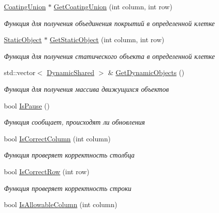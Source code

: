 \begin{DoxyCompactItemize}
\hyperlink{classrtm_1_1_coating_union}{Coating\+Union} $\ast$ \hyperlink{classrtm_1_1_world_controller_ac43dfd6de088ba04aefc8b4d9d118ea7}{Get\+Coating\+Union} (int column, int row)
\begin{DoxyCompactList}\small\item\em Функция для получения объединения покрытий в определенной клетке \end{DoxyCompactList}\item 
\hyperlink{classrtm_1_1_static_object}{Static\+Object} $\ast$ \hyperlink{classrtm_1_1_world_controller_ae949e287815fd3327b04b4225255bcf1}{Get\+Static\+Object} (int column, int row)
\begin{DoxyCompactList}\small\item\em Функция для получения статического объекта в определенной клетке \end{DoxyCompactList}\item 
std\+::vector$<$ \hyperlink{namespacertm_af668a936c29b476890a79ad1eb19e3cc}{Dynamic\+Shared} $>$ \& \hyperlink{classrtm_1_1_world_controller_a3f1ea0c4cb853482e4b4681fb14f9b4f}{Get\+Dynamic\+Objects} ()
\begin{DoxyCompactList}\small\item\em Функция для получения массива движущихся объектов \end{DoxyCompactList}\item 
bool \hyperlink{classrtm_1_1_world_controller_a028e4f7ab189c6ad5fe889ca375786e4}{Is\+Pause} ()
\begin{DoxyCompactList}\small\item\em Функция сообщает, происходят ли обновления \end{DoxyCompactList}\item 
bool \hyperlink{classrtm_1_1_world_controller_ae560ff85d296effbe814dbadc2514ccf}{Is\+Correct\+Column} (int column)
\begin{DoxyCompactList}\small\item\em Функция проверяет корректность столбца \end{DoxyCompactList}\item 
bool \hyperlink{classrtm_1_1_world_controller_ae468c9d0d4de9c4250eea4c78dc9eb7a}{Is\+Correct\+Row} (int row)
\begin{DoxyCompactList}\small\item\em Функция проверяет корректность строки \end{DoxyCompactList}\item 
bool \hyperlink{classrtm_1_1_world_controller_aae96f9a5d1a32b4c347fa07a6180f8fd}{Is\+Allowable\+Column} (int column)

\end{DoxyCompactItemize}
